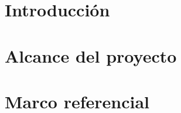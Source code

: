 \documentclass[letterpaper, 11pt, oneside]{report}
\begin{document}
	
\renewcommand{\tablename}{Tabla}

\thispagestyle{empty}

\portada
\thispagestyle{empty}
\contraportada
\thispagestyle{empty}


\thispagestyle{empty}


\thispagestyle{empty}
\renewcommand\contentsname{\centering Tabla de Contenido}
\thispagestyle{empty}
\tableofcontents
\vspace{10cm}
\listoffigures
\vspace{30cm}
\renewcommand{\listtablename}{Índice de tablas}
\listoftables

\thispagestyle{empty}



\thispagestyle{empty}




\chapter{Introducción}
\setcounter{page}{1}
\vspace{-2em}



\chapter{Alcance del proyecto}
\vspace{-2em}



\chapter{Marco referencial}


\end{document}
